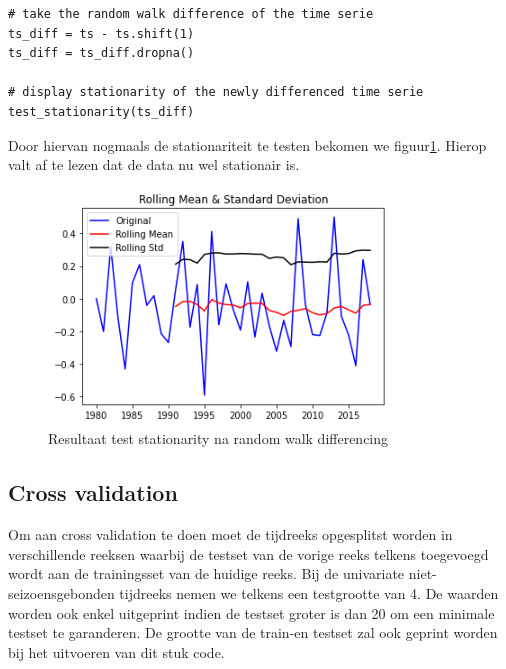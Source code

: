 \begin{verbatim}
# take the random walk difference of the time serie
ts_diff = ts - ts.shift(1)
ts_diff = ts_diff.dropna()

# display stationarity of the newly differenced time serie
test_stationarity(ts_diff)
\end{verbatim}

Door hiervan nogmaals de stationariteit te testen bekomen we figuur\ref{fig:stationarityunivariatenonseasonal2}. Hierop valt af te lezen dat de data nu wel stationair is.

\begin{figure}
    \centering
    \caption{Resultaat test stationarity na random walk differencing}
    \label{fig:stationarityunivariatenonseasonal2}
    \includegraphics[width=0.7\linewidth]{stationarity_univariate_non_seasonal2}
\end{figure}

\subsection{Cross validation}

Om aan cross validation te doen moet de tijdreeks opgesplitst worden in verschillende reeksen waarbij de testset van de vorige reeks telkens toegevoegd wordt aan de trainingsset van de huidige reeks. Bij de univariate niet-seizoensgebonden tijdreeks nemen we telkens een testgrootte van 4. De waarden worden ook enkel uitgeprint indien de testset groter is dan 20 om een minimale testset te garanderen. De grootte van de train-en testset zal ook geprint worden bij het uitvoeren van dit stuk code.

